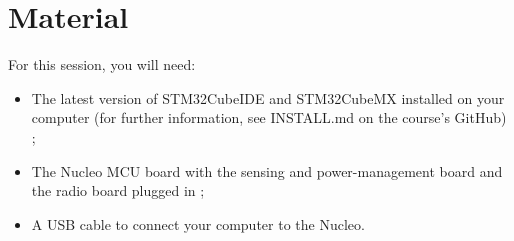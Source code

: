\section*{Material}

For this session, you will need:
\begin{itemize}
    \item The latest version of STM32CubeIDE and STM32CubeMX installed on your computer (for further information, see INSTALL.md on the course's GitHub) ;
    \item The Nucleo MCU board with the sensing and power-management board and the radio board plugged in ;
    \item A USB cable to connect your computer to the Nucleo.
\end{itemize}

